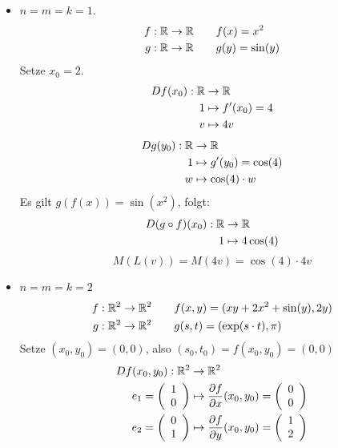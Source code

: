 \documentclass[main.tex]{subfiles}
\begin{document}
\begin{Beispiel}
  \begin{itemize}
    \item $n = m = k = 1$.
      $$\begin{aligned}
        f: \R \to \R & \qquad f(x) = x^2 \\
        g: \R \to \R & \qquad g(y) = \sin(y)
      \end{aligned}$$
      Setze $x_0 = 2$.
        $$\begin{aligned}
          Df(x_0): \R & \to \R \\
          1 & \mapsto f'(x_0) = 4 \\
          v & \mapsto 4 v
        \end{aligned}$$
        $$\begin{aligned}
          Dg(y_0): \R & \to \R \\
          1 & \mapsto g'(y_0) = \cos(4) \\
          w & \mapsto \cos(4) \cdot w
        \end{aligned}$$
      Es gilt $g(f(x)) = \sin (x^2)$, folgt:
      $$\begin{aligned}
        D(g \circ f) (x_0) : \R & \to \R \\
        1 & \mapsto 4 \cos(4)
      \end{aligned}$$
      $$M(L(v)) = M(4v) = \cos(4) \cdot 4 v$$
    \item $n = m = k = 2$
      $$\begin{aligned}
        f: \R^2 \to \R^2 & \qquad f(x,y) = (xy + 2 x^2 + \sin(y), 2y) \\
        g: \R^2 \to \R^2 & \qquad g(s,t) = (\exp(s\cdot t),\pi)
      \end{aligned}$$
      Setze $(x_0,y_0) = (0,0)$, also $(s_0, t_0) = f(x_0,y_0) = (0,0)$
        $$\begin{aligned}
          Df(x_0,y_0): \R^2 & \to \R^2 \\
          e_1  = \left(\begin{array}{c} 1 \\ 0 \end{array}\right) & \mapsto \dfrac{\partial f}{\partial x}(x_0,y_0) = \left(\begin{array}{c} 0 \\ 0 \end{array}\right) \\
          e_2  = \left(\begin{array}{c} 0 \\ 1 \end{array}\right) & \mapsto \dfrac{\partial f}{\partial y}(x_0,y_0) = \left(\begin{array}{c} 1 \\ 2 \end{array}\right) \\

\end{aligned}$$
\end{itemize}
\end{Beispiel}
\end{document}
